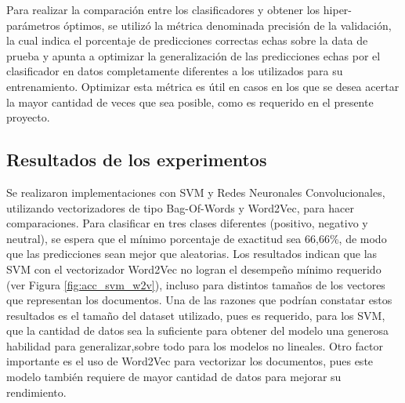 \documentclass[conference]{IEEEtran}
\begin{document}
        Para realizar la comparación entre los clasificadores y obtener los hiper-parámetros óptimos, se utilizó la métrica denominada precisión de la validación, la cual indica el porcentaje de predicciones correctas echas sobre la data de prueba y apunta a optimizar la generalización de las predicciones echas por el clasificador en datos completamente diferentes a los utilizados para su entrenamiento. Optimizar esta métrica es útil en casos en los que se desea acertar la mayor cantidad de veces que sea posible, como es requerido en el presente proyecto.
    
    
    
    
    \subsection{Resultados de los experimentos}
    
        Se realizaron implementaciones con SVM y Redes Neuronales Convolucionales, utilizando vectorizadores de tipo Bag-Of-Words y Word2Vec, para hacer comparaciones. Para clasificar en tres clases diferentes (positivo, negativo y neutral), se espera que el mínimo porcentaje de exactitud sea 66,66\%, de modo que las predicciones sean mejor que aleatorias. Los resultados indican que las SVM con el vectorizador Word2Vec no logran el desempeño mínimo requerido (ver Figura \ref{fig:acc_svm_w2v}), incluso para distintos tamaños de los vectores que representan los documentos. Una de las razones que podrían constatar estos resultados es el tamaño del dataset utilizado, pues es requerido, para los SVM, que la cantidad de datos sea la suficiente para obtener del modelo una generosa habilidad para generalizar,sobre todo para los modelos no lineales. Otro factor importante es el uso de Word2Vec para vectorizar los documentos, pues este modelo también requiere de mayor cantidad de datos para mejorar su rendimiento.
    
\end{document}
